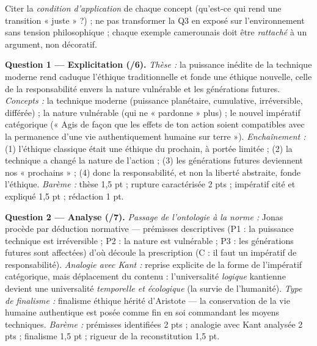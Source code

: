 \documentclass[11pt]{article}
\newcommand{\cle}[1]{{\popxbold\color{popdark}#1}}
\begin{document}
\begin{attention}
Citer la \emph{condition d'application} de chaque concept (qu'est-ce qui rend une transition « juste » ?) ; ne pas transformer la Q3 en exposé sur l'environnement sans tension philosophique ; chaque exemple camerounais doit être \emph{rattaché} à un argument, non décoratif.
\end{attention}

\begin{corrige}
\textbf{Question 1 — Explicitation (/6).} \emph{Thèse :} la puissance inédite de la technique moderne rend caduque l'éthique traditionnelle et fonde une éthique nouvelle, celle de la \cle{responsabilité} envers la nature vulnérable et les générations futures. \emph{Concepts :} la \cle{technique moderne} (puissance planétaire, cumulative, irréversible, différée) ; la nature \cle{vulnérable} (qui ne « pardonne » plus) ; le \cle{nouvel impératif catégorique} (« Agis de façon que les effets de ton action soient compatibles avec la permanence d'une vie authentiquement humaine sur terre »). \emph{Enchaînement :} (1) l'éthique classique était une éthique du prochain, à portée limitée ; (2) la technique a changé la nature de l'action ; (3) les générations futures deviennent nos « prochains » ; (4) donc la responsabilité, et non la liberté abstraite, fonde l'éthique. \emph{Barème :} thèse 1,5 pt ; rupture caractérisée 2 pts ; impératif cité et expliqué 1,5 pt ; rédaction 1 pt.

\textbf{Question 2 — Analyse (/7).} \emph{Passage de l'ontologie à la norme :} Jonas procède par \cle{déduction} normative — prémisses descriptives (P1 : la puissance technique est irréversible ; P2 : la nature est vulnérable ; P3 : les générations futures sont affectées) d'où découle la prescription (C : il faut un impératif de responsabilité). \emph{Analogie avec Kant :} reprise explicite de la forme de l'impératif catégorique, mais déplacement du contenu : l'universalité \emph{logique} kantienne devient une universalité \emph{temporelle et écologique} (la survie de l'humanité). \emph{Type de finalisme :} finalisme éthique hérité d'Aristote — la conservation de la vie humaine authentique est posée comme fin en soi commandant les moyens techniques. \emph{Barème :} prémisses identifiées 2 pts ; analogie avec Kant analysée 2 pts ; finalisme 1,5 pt ; rigueur de la reconstitution 1,5 pt.


\end{corrige}
\end{document}
